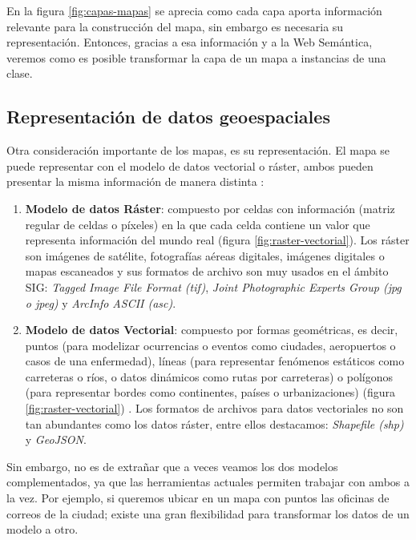 En la figura \ref{fig:capas-mapas} se aprecia como cada capa aporta información relevante para la construcción del mapa, sin embargo es necesaria su representación. Entonces, gracias a esa información y a la Web Semántica, veremos como es posible transformar la capa de un mapa a instancias de una clase.

\subsection{Representación de datos geoespaciales}


Otra consideración importante de los mapas, es su representación. El mapa se puede representar con el modelo de datos vectorial o ráster, ambos pueden presentar la misma información de manera distinta \cite{tipos-datos-sig}:

\begin{enumerate}
	\item \textbf{Modelo de datos Ráster}: compuesto por celdas con información (matriz regular de celdas o píxeles) en la que cada celda contiene un valor que representa información del mundo real (figura \ref{fig:raster-vectorial}). Los ráster son imágenes de satélite, fotografías aéreas digitales, imágenes digitales o mapas escaneados \cite{raster} y sus formatos de archivo son muy usados en el ámbito SIG: \textit{Tagged Image File Format (tif)}, \textit{Joint Photographic Experts Group (jpg o jpeg)} y \textit{ArcInfo ASCII (asc)}.
	
	\item \textbf{Modelo de datos Vectorial}: compuesto por formas geométricas, es decir, puntos (para modelizar ocurrencias o eventos como ciudades, aeropuertos o casos de una enfermedad), líneas (para representar fenómenos estáticos como carreteras o ríos, o datos dinámicos como rutas por carreteras) o polígonos (para representar bordes como continentes, países o urbanizaciones) (figura \ref{fig:raster-vectorial}) \cite{AsignaturaSIG}. Los formatos de archivos para datos vectoriales no son tan abundantes como los datos ráster, entre ellos destacamos: \textit{Shapefile (shp)} y \textit{GeoJSON}.
	
\end{enumerate}

Sin embargo, no es de extrañar que a veces veamos los dos modelos complementados, ya que las herramientas actuales permiten trabajar con ambos a la vez. Por ejemplo, si queremos ubicar en un mapa con puntos las oficinas de correos de la ciudad; existe una gran flexibilidad para transformar los datos de un modelo a otro.

